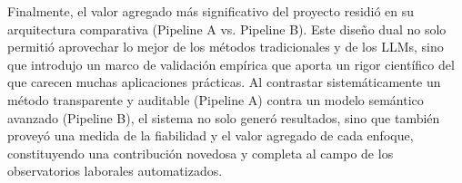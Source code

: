 Finalmente, el valor agregado más significativo del proyecto residió en su arquitectura comparativa (Pipeline A vs. Pipeline B). Este diseño dual no solo permitió aprovechar lo mejor de los métodos tradicionales y de los LLMs, sino que introdujo un marco de validación empírica que aporta un rigor científico del que carecen muchas aplicaciones prácticas. Al contrastar sistemáticamente un método transparente y auditable (Pipeline A) contra un modelo semántico avanzado (Pipeline B), el sistema no solo generó resultados, sino que también proveyó una medida de la fiabilidad y el valor agregado de cada enfoque, constituyendo una contribución novedosa y completa al campo de los observatorios laborales automatizados.
